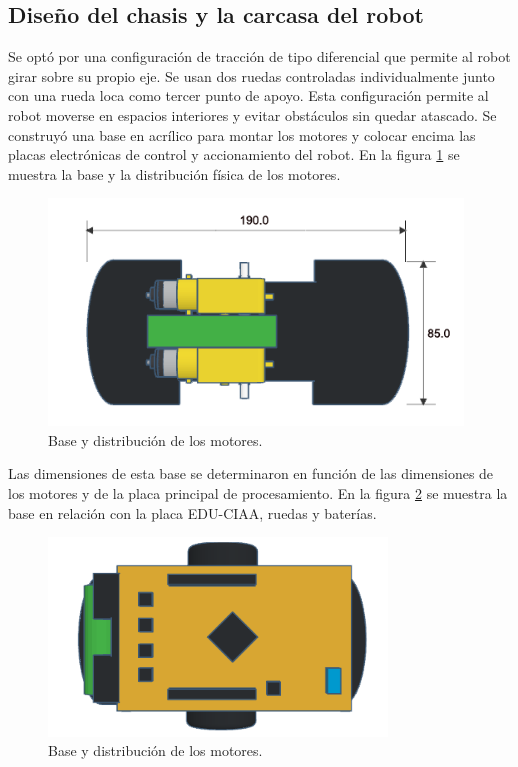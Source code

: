 \subsection{Diseño del chasis y la carcasa del robot}
Se optó por una configuración de tracción de tipo diferencial \citep{traccion} que permite al robot girar sobre su propio eje. Se usan dos ruedas controladas individualmente junto con una rueda loca como tercer punto de apoyo. Esta configuración permite al robot moverse en espacios interiores y evitar obstáculos sin quedar atascado. 
Se construyó una base en acrílico para montar los motores y colocar encima las placas electrónicas de control y accionamiento del robot. En la figura \ref{fig:base} se muestra la base y la distribución física de los motores. 

\begin{figure}[h]
	\centering
	\includegraphics[width=11cm]{./Figures/base.png}
	\caption{Base y distribución de los motores.}
	\label{fig:base}
\end{figure}

Las dimensiones de esta base se determinaron en función de las dimensiones de los motores y de la placa principal de procesamiento. En la figura \ref{fig:baseeduciaa} se muestra la base en relación con la placa EDU-CIAA, ruedas y baterías. 

\begin{figure}[h]
	\centering
	\includegraphics[width=9cm]{./Figures/baseeduciaa.png}
	\caption{Base y distribución de los motores.}
	\label{fig:baseeduciaa}
\end{figure}


